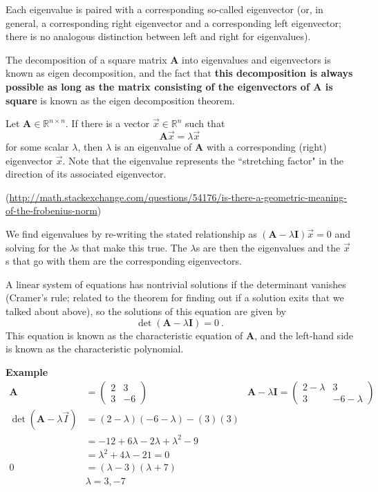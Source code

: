 \documentclass[12pt]{article}
\newcommand{\ve}[1]{\ensuremath{\mathbf{#1}}}
\begin{document}
Each eigenvalue is paired with a corresponding so-called eigenvector (or, in general, a corresponding right eigenvector and a corresponding left eigenvector; there is no analogous distinction between left and right for eigenvalues).

The decomposition of a square matrix $\ve{A}$ into eigenvalues and eigenvectors is known as eigen decomposition, and the fact that \textbf{this decomposition is always possible as long as the matrix consisting of the eigenvectors of $\ve{A}$ is square} is known as the eigen decomposition theorem.

Let $\ve{A} \in \mathbb{R}^{n \times n}$. If there is a vector $\vec{x} \in \mathbb{R}^{n}$ such that
%
\[\ve{A} \vec{x} = \lambda \vec{x}\]
%
for some scalar $\lambda$, then $\lambda$ is an eigenvalue of $\ve{A}$ with a corresponding (right) eigenvector $\vec{x}$. Note that the eigenvalue represents the ``stretching factor" in the direction of its associated eigenvector. 

(\href{http://math.stackexchange.com/questions/54176/is-there-a-geometric-meaning-of-the-frobenius-norm}{http://math.stackexchange.com/questions/54176/is-there-a-geometric-meaning-of-the-frobenius-norm})
 
We find eigenvalues by re-writing the stated relationship as $(\ve{A} - \lambda \ve{I})\vec{x}=0$ and solving for the $\lambda$s that make this true. The $\lambda$s are then the eigenvalues and the $\vec{x}$s that go with them are the corresponding eigenvectors. 

A linear system of equations has nontrivial solutions if the determinant vanishes (Cramer's rule; related to the theorem for finding out if a solution exits that we talked about above), so the solutions of this equation are given by
%
\[\det(\ve{A} - \lambda \ve{I})=0 \:.\] 	
%
This equation is known as the characteristic equation of $\ve{A}$, and the left-hand side is known as the characteristic polynomial.

\textbf{Example}
\begin{align}
    \ve{A} &= \begin{pmatrix}
        2 & 3 \\
        3 & -6
    \end{pmatrix} 
    &\ve{A} - \lambda \ve{I} = \begin{pmatrix}
        2 - \lambda & 3 \\
        3 & -6 - \lambda
    \end{pmatrix} \nonumber \\
%  
\det(\ve{A} - \lambda \vec{I}) &= (2 - \lambda)(-6 - \lambda) - (3)(3) \nonumber \\
%
&= -12 + 6\lambda -2\lambda + \lambda^2 -9 \nonumber \\
&= \lambda^2 + 4\lambda -21 = 0 \nonumber \\
0 &= (\lambda - 3)(\lambda + 7) \nonumber \\
&\boxed{\lambda = 3, -7} \nonumber
\end{align} 
\end{document}
